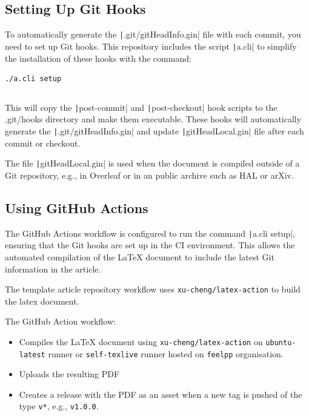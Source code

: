 \documentclass[a4paper]{article}
\begin{document}
\subsection{Setting Up Git Hooks}

To automatically generate the \texttt|.git/gitHeadInfo.gin| file with each commit, you need to set up Git hooks. 
This repository includes the script \texttt|a.cli| to simplify the installation of these hooks with the command:

\begin{verbatim}
./a.cli setup
\end{verbatim}

\inputminted[linenos,autogobble,bgcolor=background,fontsize=\small,firstline=6,lastline=23]{sh}{a.cli}

This will copy the \texttt|post-commit| and \texttt|post-checkout| hook scripts to the .git/hooks directory and make them executable. 
These hooks will automatically generate the \texttt|.git/gitHeadInfo.gin| and update \texttt|gitHeadLocal.gin| file after each commit or checkout.

The file \texttt|gitHeadLocal.gin| is used when the document is compiled outside of a Git repository, e.g., in Overleaf or in an public archive such as HAL or arXiv.


\subsection{Using GitHub Actions}

The GitHub Actions workflow is configured to run the command \texttt|a.cli setup|, ensuring that the Git hooks are set up in the CI environment.
This allows the automated compilation of the LaTeX document to include the latest Git information in the article.

The template article repository workflow uses \citep{cheng_xu_xu-chenglatex-action_2024} \texttt{xu-cheng/latex-action} to build the latex document.

The GitHub Action workflow:
\begin{itemize}
    \item Compiles the LaTeX document using \texttt{xu-cheng/latex-action} on \texttt{ubuntu-latest} runner or \texttt{self-texlive} runner hosted on \texttt{feelpp} organisation.
    \item Uploads the resulting PDF
    \item Creates a release with the PDF as an asset when a new tag is pushed of the type \texttt{v*}, e.g., \texttt{v1.0.0}.
\end{itemize}
\end{document}
